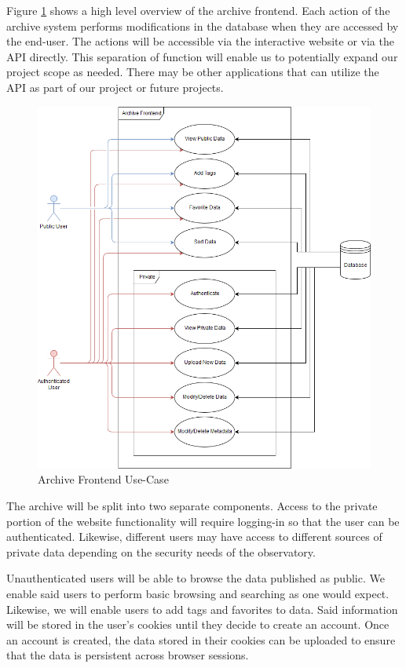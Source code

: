 \documentclass[12pt]{report}
\begin{document}
Figure \ref{fig:archiveusecase} shows a high level overview of the archive frontend. Each action of the archive system performs modifications in the database when they are accessed by the end-user. The actions will be accessible via the interactive website or via the API directly. This separation of function will enable us to potentially expand our project scope as needed. There may be other applications that can utilize the API as part of our project or future projects.

\begin{figure}[h]
	\centering
	\includegraphics[width=0.75\linewidth]{frontend_use_case}
	\caption{Archive Frontend Use-Case}
	\label{fig:archiveusecase}
\end{figure}

The archive will be split into two separate components. Access to the private portion of the website functionality will require logging-in so that the user can be authenticated. Likewise, different users may have access to different sources of private data depending on the security needs of the observatory.

Unauthenticated users will be able to browse the data published as public. We enable said users to perform basic browsing and searching as one would expect. Likewise, we will enable users to add tags and favorites to data. Said information will be stored in the user's cookies until they decide to create an account. Once an account is created, the data stored in their cookies can be uploaded to ensure that the data is persistent across browser sessions.
\end{document}
